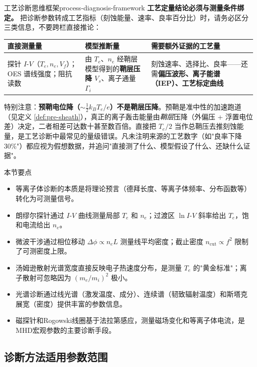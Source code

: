 \documentclass[12pt,a4paper,openany,oneside]{book}
\begin{document}
\begin{insight}{工艺诊断思维框架}{process-diagnosis-framework}
\textbf{工艺定量结论必须与测量条件绑定。} 把诊断参数转成工艺指标（刻蚀能量、速率、良率百分比）时，请务必区分三类信息，不要跨栏直接推论：
\begin{center}
\setlength{\tabcolsep}{4pt}
\begin{tabular}{@{}p{3.2cm}p{3.6cm}p{4.4cm}@{}}
\toprule
\textbf{直接测量量} & \textbf{模型推断量} & \textbf{需要额外证据的工艺量} \\
\midrule
探针 $I$-$V$（$T_e,n_e,V_f$）；OES 谱线强度；阻抗读数 & 由 $T_e$、$n_e$ 经鞘层模型得到的\textbf{鞘层压降 $V_s$}、离子通量 $\Gamma_i$ & 刻蚀速率、选择比、良率——还需\textbf{偏压波形、离子能谱（IEP）、工艺标定曲线} \\
\bottomrule
\end{tabular}
\end{center}
特别注意：\textbf{预鞘电位降（$\sim\frac12 k_BT_e/e$）不是鞘层压降}。预鞘是准中性的加速跑道（见定义 \ref{def:pre-sheath}），真正的离子轰击能量由\emph{鞘层}压降（外偏压 + 浮置电位差）决定，二者相差可达数十甚至数百倍。直接把 $T_e/2$ 当作总鞘压去推刻蚀能量，是工艺诊断中最常见的量级错误。凡未注明来源的工艺数字（如"良率下降 30\%"）都应视为假想数据，并追问"直接测了什么、模型假设了什么、还缺什么证据"。
\end{insight}

\begin{review}{本节要点}{}
\begin{itemize}
    \item 等离子体诊断的本质是将理论预言（德拜长度、等离子体频率、分布函数等）转化为可测量信号。
    \item 朗缪尔探针通过 $I$-$V$ 曲线测量局部 $T_e$ 和 $n_e$；过渡区 $\ln I$-$V$ 斜率给出 $T_e$，饱和电流给出 $n_e$。
    \item 微波干涉通过相位移动 $\Delta\phi \propto n_e L$ 测量线平均密度；截止密度 $n_{\mathrm{cut}} \propto f^2$ 限制了可测密度上限。
    \item 汤姆逊散射光谱宽度直接反映电子热速度分布，是测量 $T_e$ 的"黄金标准"；离子散射可忽略因为 $(m_e/m_i)^2$ 极小。
    \item 光谱诊断通过线光谱（激发温度、成分）、连续谱（韧致辐射温度）和斯塔克展宽（密度）提供丰富的参数信息。
    \item 磁探针和Rogowski线圈基于法拉第感应，测量磁场变化和等离子体电流，是MHD宏观参数的主要诊断手段。
\end{itemize}
\end{review}

\subsection{诊断方法适用参数范围}
\end{document}
